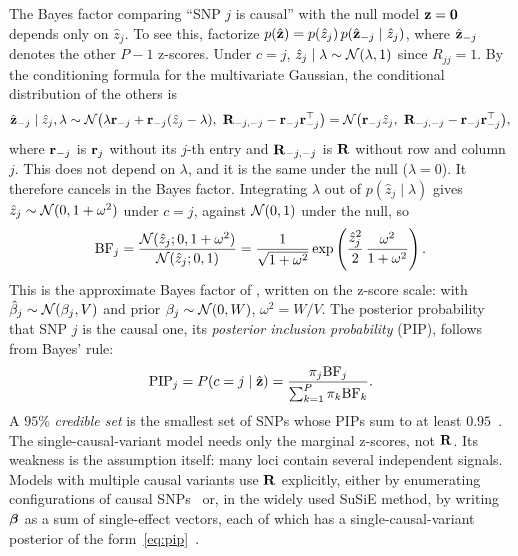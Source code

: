 The Bayes factor comparing ``SNP $j$ is causal'' with the null model $\mathbf{z}=\mathbf{0}$ depends only on $\hat z_j$. To see this, factorize $p(\hat{\mathbf{z}})=p(\hat z_j)\,p(\hat{\mathbf{z}}_{-j}\mid\hat z_j)$, where $\hat{\mathbf{z}}_{-j}$ denotes the other $P-1$ z-scores. Under $c=j$, $\hat z_j\mid\lambda\sim\mathcal{N}(\lambda,1)$ since $R_{jj}=1$. By the conditioning formula for the multivariate Gaussian, the conditional distribution of the others is
\begin{equation}
  \vzh_{-j}\mid\hat z_j,\lambda\sim\Normal\bigl(\lambda\vr_{-j}+\vr_{-j}(\hat z_j-\lambda),\ \mR_{-j,-j}-\vr_{-j}\vr_{-j}^\top\bigr) = \Normal\bigl(\vr_{-j}\hat z_j,\ \mR_{-j,-j}-\vr_{-j}\vr_{-j}^\top\bigr),
\end{equation}
where $\mathbf{r}_{-j}$ is $\mathbf{r}_j$ without its $j$-th entry and $\mathbf{R}_{-j,-j}$ is $\mathbf{R}$ without row and column $j$. This does not depend on $\lambda$, and it is the same under the null ($\lambda=0$). It therefore cancels in the Bayes factor. Integrating $\lambda$ out of $p(\hat z_j\mid\lambda)$ gives $\hat z_j\sim\mathcal{N}(0,1+\omega^2)$ under $c=j$, against $\mathcal{N}(0,1)$ under the null, so
\begin{equation}
  \mathrm{BF}_j = \frac{\mathcal{N}(\hat z_j;0,1+\omega^2)}{\mathcal{N}(\hat z_j;0,1)} = \frac1{\sqrt{1+\omega^2}}\exp\left(\frac{\hat z_j^2}2\,\frac{\omega^2}{1+\omega^2}\right).
  \label{eq:abf}
\end{equation}
This is the approximate Bayes factor of \citet{wakefield2009}, written on the z-score scale: with $\hat\beta_j\sim\mathcal{N}(\beta_j,V)$ and prior $\beta_j\sim\mathcal{N}(0,W)$, $\omega^2=W/V$. The posterior probability that SNP $j$ is the causal one, its \emph{posterior inclusion probability} (PIP), follows from Bayes' rule:
\begin{equation}
  \mathrm{PIP}_j = P(c=j\mid\hat{\mathbf{z}}) = \frac{\pi_j\mathrm{BF}_j}{\sum_{k=1}^P\pi_k\mathrm{BF}_k}.
  \label{eq:pip}
\end{equation}
A $95\%$ \emph{credible set} is the smallest set of SNPs whose PIPs sum to at least $0.95$~\citep{maller2012}. The single-causal-variant model needs only the marginal z-scores, not $\mathbf{R}$. Its weakness is the assumption itself: many loci contain several independent signals. Models with multiple causal variants use $\mathbf{R}$ explicitly, either by enumerating configurations of causal SNPs~\citep{hormozdiari2014} or, in the widely used SuSiE method, by writing $\boldsymbol{\beta}$ as a sum of single-effect vectors, each of which has a single-causal-variant posterior of the form~\eqref{eq:pip}~\citep{wang2020susie}.

